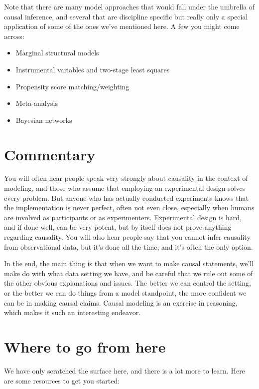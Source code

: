 \documentclass[
  letterpaper,
]{krantz}
\providecommand{\tightlist}{%
  \setlength{\itemsep}{0pt}\setlength{\parskip}{0pt}}\usepackage{longtable,booktabs,array}
\begin{document}
Note that there are many model approaches that would fall under the
umbrella of causal inference, and several that are discipline specific
but really only a special application of some of the ones we've
mentioned here. A few you might come across:

\begin{itemize}
\tightlist
\item
  Marginal structural models
\item
  Instrumental variables and two-stage least squares
\item
  Propensity score matching/weighting
\item
  Meta-analysis
\item
  Bayesian networks
\end{itemize}

\section{Commentary}\label{commentary-3}

You will often hear people speak very strongly about causality in the
context of modeling, and those who assume that employing an experimental
design solves every problem. But anyone who has actually conducted
experiments knows that the implementation is never perfect, often not
even close, especially when humans are involved as participants or as
experimenters. Experimental design is hard, and if done well, can be
very potent, but by itself does not prove anything regarding causality.
You will also hear people say that you cannot infer causality from
observational data, but it's done all the time, and it's often the only
option.

In the end, the main thing is that when we want to make causal
statements, we'll make do with what data setting we have, and be careful
that we rule out some of the other obvious explanations and issues. The
better we can control the setting, or the better we can do things from a
model standpoint, the more confident we can be in making causal claims.
Causal modeling is an exercise in reasoning, which makes it such an
interesting endeavor.

\section{Where to go from here}\label{where-to-go-from-here-3}

We have only scratched the surface here, and there is a lot more to
learn. Here are some resources to get you started:
\end{document}
